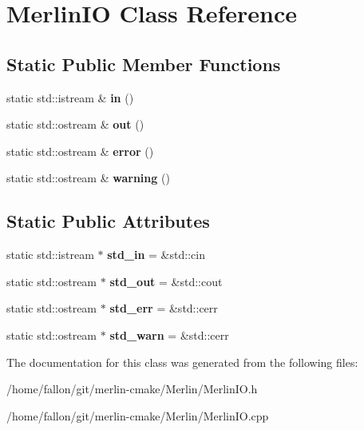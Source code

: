 \hypertarget{classMerlinIO}{}\section{Merlin\+IO Class Reference}
\label{classMerlinIO}
\subsection*{Static Public Member Functions}
\begin{DoxyCompactItemize}
\item 
\mbox{\label{classMerlinIO_a536df209dfd388a76015d3ab7a3a4021}} 
static std\+::istream \& {\bfseries in} ()
\item 
\mbox{\label{classMerlinIO_abca2e07f9240cf2e1939ea4f92fc9191}} 
static std\+::ostream \& {\bfseries out} ()
\item 
\mbox{\label{classMerlinIO_af7f3478d3ceb8155ccf6ab3a43917ccb}} 
static std\+::ostream \& {\bfseries error} ()
\item 
\mbox{\label{classMerlinIO_ac4e062e20481279616e56126b4575c8a}} 
static std\+::ostream \& {\bfseries warning} ()
\end{DoxyCompactItemize}
\subsection*{Static Public Attributes}
\begin{DoxyCompactItemize}
\item 
\mbox{\label{classMerlinIO_ace749bc506c0bc96249220c04546a9da}} 
static std\+::istream $\ast$ {\bfseries std\+\_\+in} = \&std\+::cin
\item 
\mbox{\label{classMerlinIO_a55751722b15bac17efbc11d5009f7f9e}} 
static std\+::ostream $\ast$ {\bfseries std\+\_\+out} = \&std\+::cout
\item 
\mbox{\label{classMerlinIO_a32ced0f64eb98819758cc150a0bad430}} 
static std\+::ostream $\ast$ {\bfseries std\+\_\+err} = \&std\+::cerr
\item 
\mbox{\label{classMerlinIO_aa0b6d4999bdfe3fd74897c436668e202}} 
static std\+::ostream $\ast$ {\bfseries std\+\_\+warn} = \&std\+::cerr
\end{DoxyCompactItemize}


The documentation for this class was generated from the following files\+:\begin{DoxyCompactItemize}
\item 
/home/fallon/git/merlin-\/cmake/\+Merlin/Merlin\+I\+O.\+h\item 
/home/fallon/git/merlin-\/cmake/\+Merlin/Merlin\+I\+O.\+cpp\end{DoxyCompactItemize}
